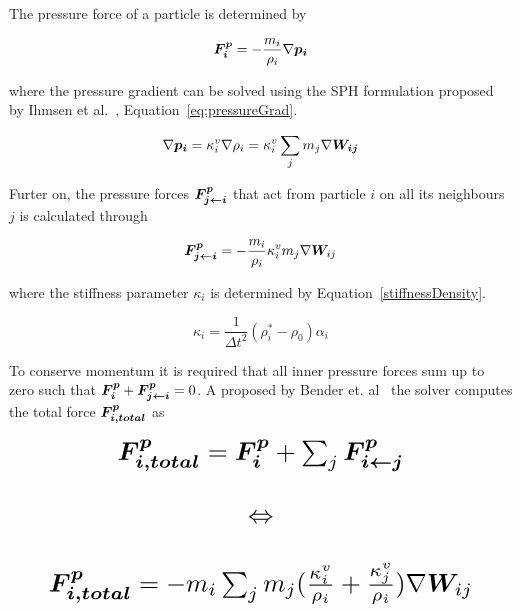     The pressure force of a particle is determined by 

    \begin{equation} \label{eq:pressure}
        \bm{F_i^p} = -\frac{m_i}{\rho_i}\nabla \bm{p_i}
    \end{equation}

    where the pressure gradient can be solved using the SPH formulation proposed by Ihmsen et al.~\cite{ihmsen}, Equation~\ref{eq:pressureGrad}.

    \begin{equation} \label{eq:pressureGrad}
        \nabla \bm{p_i} = \kappa_i^v \nabla \rho_i = \kappa_i^v \sum_j m_j \nabla \bm{W_{ij}}
    \end{equation}

    Furter on, the pressure forces $\bm{F_{j\leftarrow i}^p} $ that act from particle $i$ on all its neighbours $j$ is calculated through

    \begin{equation} \label{eq:pressure2}
        \bm{F_{j\leftarrow i}^p} = -\frac{m_i}{\rho_i} \kappa_i^v m_j \nabla \bm{W}_{ij}
    \end{equation}

    where the stiffness parameter $\kappa_i$ is determined by Equation~\ref{stiffnessDensity}.

    \begin{equation} \label{stiffnessDensity}
    \kappa_i = \frac{1}{\Delta t^2}(\rho_i^*-\rho_0)\alpha_i
    \end{equation}

    To conserve momentum it is required that all inner pressure forces sum up to zero such that $\bm{F_i^p} + \bm{F_{j\leftarrow i}^p} = 0$. A proposed by Bender et. al~\cite{bender} the solver computes the total force $\bm{F_{i,total}^p}$ as

    \begin{equation} \label{eq:pressureTotal}
        \resizebox{0.88\linewidth}{!}{$
        \begin{matrix}
            \vect{F_{i,total}^p} = \vect{F_i^p} + \sum_j \vect{F_{i\leftarrow j}^p} \\
            \\
            \Leftrightarrow \\ 
            \\
            \vect{F_{i,total}^p} = -m_i \sum_j m_j (\frac{\kappa_i^v}{\rho_i} + \frac{\kappa_j^v}{\rho_i}) \nabla \vect{W}_{ij}
        \end{matrix}
        $}
    \end{equation}

